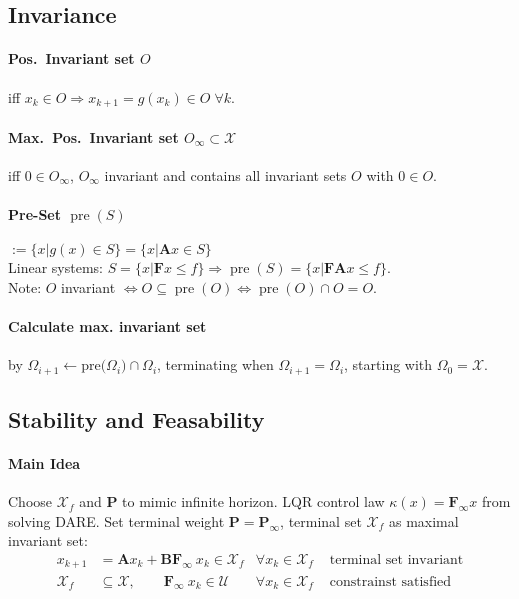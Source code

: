 \documentclass[landscape,a4paper,8pt]{scrartcl}
\renewcommand{\iff}{\Leftrightarrow}
\renewcommand{\implies}{\Rightarrow}
\newcommand{\mc}[1]{\mathcal{#1}}
\newcommand\vA{\bm{A}}
\newcommand\vB{\bm{B}}
\newcommand\vF{\bm{F}}
\newcommand\vP{\bm{P}}
\DeclareMathOperator\pre{pre}
\begin{document}
\begin{multicols*}{3}
\subsection{Invariance}
\paragraph{Pos.\ Invariant set $O$} iff $x_k \in O \implies x_{k+1} = g(x_k) \in O \; \forall k$.
\paragraph{Max.\ Pos.\ Invariant set $O_\infty \subset \mc X$} iff $0 \in O_\infty$, $O_\infty$ invariant and contains all invariant sets $O$ with $0 \in O$.
\paragraph{Pre-Set $\pre(S)$}
$:= \{ x | g(x) \in S\} = \{ x | \vA x \in S \}$ \\
Linear systems: $S = \{ x | \vF x \leq f\} \implies \pre(S) = \{ x | \vF\vA x \leq f\}$. \\
Note: $O$ invariant $\iff O \subseteq \pre(O) \iff \pre(O) \cap O = O$.
\paragraph{Calculate max. invariant set} by
$\Omega_{i+1} \leftarrow \text{pre($\Omega_i$)} \cap \Omega_i$, terminating when $\Omega_{i+1} = \Omega_i$,
starting with $\Omega_0 = \mc X$.

\subsection{Stability and Feasability}

\paragraph{Main Idea} Choose $\mc X_f$ and $\vP$ to mimic infinite horizon.
LQR control law $\kappa(x) = \vF_\infty x$ from solving DARE.
Set terminal weight $\vP = \vP_\infty$, terminal set $\mc X_f$ as maximal invariant set:
\begin{align*}
x_{k+1} & = \vA x_k + \vB\vF_\infty\ x_k \in \mc X_f & \forall x_k \in \mc X_f & \text{ terminal set invariant} \\
\mc X_f & \subseteq \mc X, \qquad \vF_\infty\ x_k \in \mc U & \forall x_k \in \mc X_f & \text{ constrainst satisfied}
\end{align*}

\end{multicols*}
\end{document}
